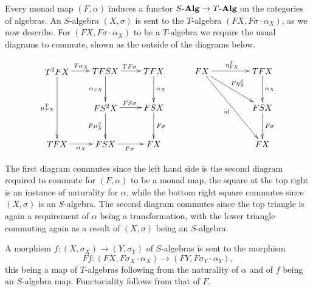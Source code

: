 \begin{rem}
Every monad map $(F,\alpha)$ induces a functor $S\mbox{-}\mathbf{Alg} \rightarrow T\mbox{-}\mathbf{Alg}$ on the categories of algebras. An $S$-algebra $(X,\sigma)$ is sent to the $T$-algebra $(FX,F\sigma \cdot \alpha_X)$, as we now describe. For $(FX,F\sigma \cdot \alpha_X)$ to be a $T$-algebra we require the usual diagrams to commute, shown as the outside of the diagrams below.

  \[
    \xy
      (0,0)*+{T^2FX}="a";
      (20,0)*+{TFSX}="b";
      (40,0)*+{TFX}="c";
      (0,-30)*+{TFX}="d";
      (20,-15)*+{FS^2X}="f";
      (20,-30)*+{FSX}="e";
      (40,-15)*+{FSX}="g";
      (40,-30)*+{FX}="h";
      {\ar^{T\alpha_X} "a" ; "b"};
      {\ar^{TF\sigma} "b" ; "c"};
      {\ar^{\alpha_X} "c" ; "g"};
      {\ar^{F\sigma} "g" ; "h"};
      {\ar_{\mu^T_{FX}} "a" ; "d"};
      {\ar_{\alpha_X} "d" ; "e"};
      {\ar_{F\sigma} "e" ; "h"};
      {\ar_{\alpha_{SX}} "b" ; "f"};
      {\ar_{F\mu^S_X} "f" ; "e"};
      {\ar^{FS\sigma} "f" ; "g"};
      (60,0)*+{FX}="a1";
      (85,0)*+{TFX}="b1";
      (85,-15)*+{FSX}="c1";
      (85,-30)*+{FX}="d1";
      {\ar^{\eta^T_{FX}} "a1" ; "b1"};
      {\ar^{\alpha_X} "b1" ; "c1"};
      {\ar^{F\sigma} "c1" ; "d1"};
      {\ar^{F\eta^S_X} "a1" ; "c1"};
      {\ar_{\id} "a1" ; "d1"};
    \endxy
  \]

The first diagram commutes since the left hand side is the second diagram required to commute for $(F,\alpha)$ to be a monad map, the square at the top right is an instance of naturality for $\alpha$, while the bottom right square commutes since $(X,\sigma)$ is an $S$-algebra. The second diagram commutes since the top triangle is again a requirement of $\alpha$ being a transformation, with the lower triangle commuting again as a result of $(X,\sigma)$ being an $S$-algebra.

A morphism $f \colon  (X, \sigma_X) \rightarrow (Y, \sigma_Y)$ of $S$-algebras is sent to the morphism
  \[
    Ff \colon  (FX, F\sigma_X \cdot \alpha_X) \rightarrow (FY, F\sigma_Y \cdot \alpha_Y),
  \]
this being a map of $T$-algebras following from the naturality of $\alpha$ and of $f$ being an $S$-algebra map. Functoriality follows from that of $F$.
\end{rem}

